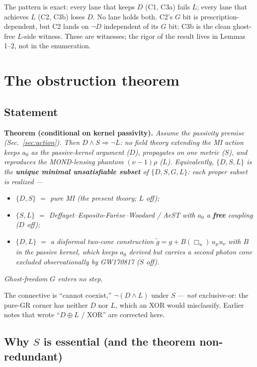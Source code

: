 \documentclass[11pt]{article}
\newcommand{\Boxu}{\Box_u}
\begin{document}
The pattern is exact: every lane that keeps $D$ (C1, C3a) fails $L$; every lane that achieves $L$ (C2, C3b) loses $D$. No lane holds both. C2's $G$ bit is prescription-dependent, but C2 lands on $\lnot D$ independent of its $G$ bit; C3b is the clean ghost-free $L$-side witness. These are witnesses; the rigor of the result lives in Lemmas 1--2, not in the enumeration.

\section{The obstruction theorem}\label{sec:theorem}

\subsection{Statement}

\textbf{Theorem (conditional on kernel passivity).} \emph{Assume the passivity premise (Sec.~\ref{sec:action}). Then $D\wedge S\Rightarrow\lnot L$: no field theory extending the MI action keeps $a_0$ as the passive-kernel argument ($D$), propagates on one metric ($S$), and reproduces the MOND-lensing phantom $(\nu-1)\rho$ ($L$). Equivalently, $\{D,S,L\}$ is the \textbf{unique minimal unsatisfiable subset} of $\{D,S,G,L\}$: each proper subset is realized ---}
\begin{itemize}
\item \emph{$\{D,S\}$ $=$ pure MI (the present theory; $L$ off);}
\item \emph{$\{S,L\}$ $=$ Deffayet--Esposito-Far\`ese--Woodard / AeST with $a_0$ a \textbf{free} coupling ($D$ off);}
\item \emph{$\{D,L\}$ $=$ a disformal two-cone construction $\tilde g=g+B(\Boxu)\,u_\mu u_\nu$ with $B$ in the passive kernel, which keeps $a_0$ derived but carries a second photon cone excluded observationally by GW170817 ($S$ off).}
\end{itemize}
\emph{Ghost-freedom $G$ enters no step.}

The connective is ``cannot coexist,'' $\lnot(D\wedge L)$ under $S$ --- \emph{not} exclusive-or: the pure-GR corner has neither $D$ nor $L$, which an XOR would misclassify. Earlier notes that wrote ``$D\oplus L$ / XOR'' are corrected here.

\subsection{Why $S$ is essential (and the theorem non-redundant)}\label{sec:whyS}
\end{document}
